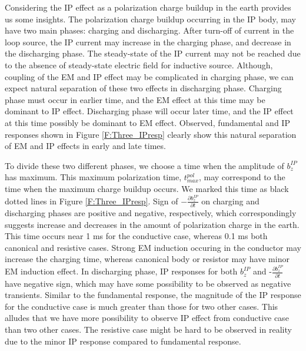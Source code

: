 \documentclass[a4paper, 11pt]{article}
\newcommand{\bzip}{b_z^{IP}}
\newcommand{\dbzdtip}{\frac{\partial b_z^{IP}}{\partial t}}
\begin{document}
Considering the IP effect as a polarization charge buildup in the earth provides us some insights.
The polarization charge buildup occurring in the IP body, may have two main phases: charging and discharging.
After turn-off of current in the loop source, the IP current may increase in the charging phase, and decrease in the discharging phase. 
The steady-state of the IP current may not be reached due to the absence of steady-state electric field for inductive source. 
Although, coupling of the EM and IP effect may be complicated in charging phase, we can expect natural separation of these two effects in discharging phase. 
Charging phase must occur in earlier time, and the EM effect at this time may be dominant to IP effect. 
Discharging phase will occur later time, and the IP effect at this time possibly be dominant to EM effect. 
Observed, fundamental and IP responses shown in Figure \ref{F:Three_IPresp} clearly show this natural separation of EM and IP effects in early and late times. 

To divide these two different phases, we choose a time when the amplitude of $\bzip$ has maximum. 
This maximum polarization time, $t^{pol}_{max}$, may correspond to the time when the maximum  charge buildup occurs. 
We marked this time as black dotted lines in Figure \ref{F:Three_IPresp}.
Sign of $-\dbzdtip$ on charging and discharging phases are positive and negative, respectively, which correspondingly suggests increase and decreases in the amount of polarization charge in the earth. 
This time occurs near 1 ms for the conductive case, whereas 0.1 ms both canonical and resistive cases. 
Strong EM induction occuring in the conductor may increase the charging time, whereas canonical body or resistor may have minor EM induction effect. 
In discharging phase, IP responses for both $\bzip$ and -$\dbzdtip$ have negative sign, which may have some possibility to be observed as negative transients. 
Similar to the fundamental response, the magnitude of the IP response for the conductive case is much greater than those for two other cases. 
This alludes that we have more possibility to observe IP effect from conductive case than two other cases. 
The resistive case might be hard to be observed in reality due to the minor IP response compared to fundamental response. 
\end{document}
